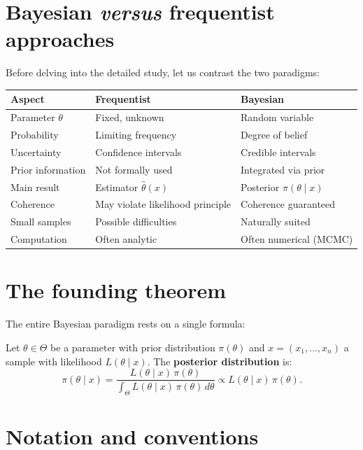 \section*{Bayesian \textit{versus} frequentist approaches}

Before delving into the detailed study, let us contrast the two
paradigms:

\begin{center}
\renewcommand{\arraystretch}{1.3}
\begin{tabular}{p{4cm} p{5cm} p{5cm}}
\toprule
\textbf{Aspect} & \textbf{Frequentist} & \textbf{Bayesian} \\
\midrule
Parameter $\theta$ & Fixed, unknown & Random variable \\
Probability & Limiting frequency & Degree of belief \\
Uncertainty & Confidence intervals & Credible intervals \\
Prior information & Not formally used & Integrated via prior \\
Main result & Estimator $\hat{\theta}(x)$ & Posterior $\pi(\theta \mid x)$ \\
Coherence & May violate likelihood principle & Coherence guaranteed \\
Small samples & Possible difficulties & Naturally suited \\
Computation & Often analytic & Often numerical (MCMC) \\
\bottomrule
\end{tabular}
\end{center}

\section*{The founding theorem}

The entire Bayesian paradigm rests on a single formula:

\begin{keyformulas}[title=\textbf{Bayes' Theorem}]
Let $\theta \in \Theta$ be a parameter with prior distribution
$\pi(\theta)$ and $x = (x_1, \ldots, x_n)$ a sample with likelihood
$L(\theta \mid x)$. The \textbf{posterior distribution} is:
\[
  \pi(\theta \mid x)
  = \frac{L(\theta \mid x)\,\pi(\theta)}
         {\int_{\Theta} L(\theta \mid x)\,\pi(\theta)\,d\theta}
  \propto L(\theta \mid x)\,\pi(\theta).
\]
\end{keyformulas}

\section*{Notation and conventions}


